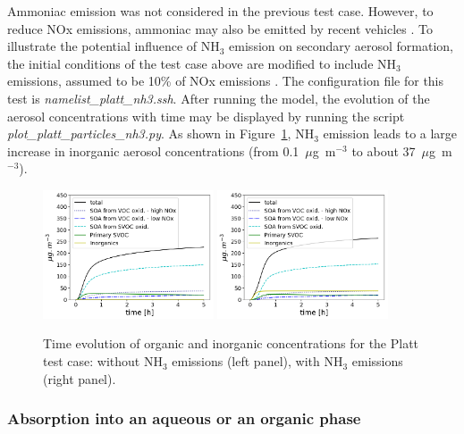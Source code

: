\documentclass[a4paper,11pt]{article}
\begin{document}
{{Ammoniac emission was not considered in the previous test case. However, to reduce NOx emissions, ammoniac may also be emitted by recent vehicles \cite{suarez17}. 
To illustrate the potential influence of NH$_3$ emission on secondary aerosol formation, the initial conditions of the test case above are modified to include NH$_3$ emissions, assumed to be 10\% of NOx emissions \cite{suarez17}. 
The configuration file for this test is {\it{namelist\_platt\_nh3.ssh}}.
After running the model, the evolution of the aerosol concentrations with time may be displayed by running the script {\it{plot\_platt\_particles\_nh3.py}}.
As shown in Figure~\ref{fig-platt}, NH$_3$ emission leads to a large increase in inorganic aerosol concentrations (from 0.1~$\mu$g~m$^{-3}$ to about 37~$\mu$g~m$^{-3}$).

\begin{figure}[H]
        \begin{center}
                \includegraphics[angle=0,width=0.45\textwidth]{../graph/figure_ref/platt-particles.png}
                \includegraphics[angle=0,width=0.45\textwidth]{../graph/figure_ref/platt-particles-nh3.png}
        \end{center}
	\caption{Time evolution of organic and inorganic concentrations for the Platt test case: without NH$_3$ emissions (left panel), with NH$_3$ emissions (right panel).}
\label{fig-platt}
\end{figure}

\subsubsection{Absorption into an aqueous or an organic phase}
\label{hybhyd}

}}
\end{document}
